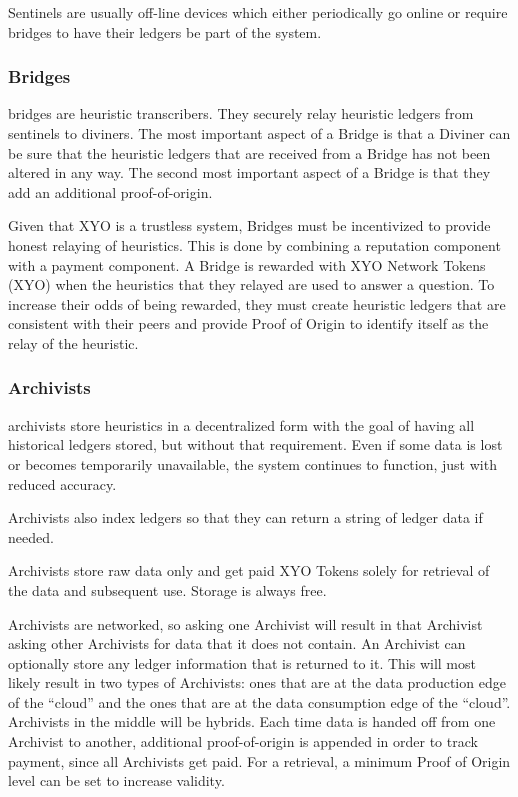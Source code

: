 \documentclass{article}
\begin{document}
Sentinels are usually off-line devices which either periodically go online or require \Glspl{bridge} to have their ledgers be part of the system.

\subsubsection {Bridges}
\Glspl{bridge} are \gls{heuristic} transcribers. They securely relay heuristic ledgers from \Glspl{sentinel} to \Glspl{diviner}. The most important aspect of a Bridge is that a Diviner can be sure that the heuristic ledgers that are received from a Bridge has not been altered in any way. The second most important aspect of a Bridge is that they add an additional \Gls{proof-of-origin}.

Given that \Gls{XYO} is a trustless system, Bridges must be incentivized to provide honest relaying of heuristics. This is done by combining a reputation component with a payment component. A Bridge is rewarded with XYO Network Tokens (XYO) when the heuristics that they relayed are used to answer a question. To increase their odds of being rewarded, they must create heuristic ledgers that are consistent with their peers and provide Proof of Origin to identify itself as the relay of the heuristic.

\subsubsection {Archivists}
\Glspl{archivist} store \glspl{heuristic} in a decentralized form with the goal of having all historical ledgers stored, but without that requirement. Even if some data is lost or becomes temporarily unavailable, the system continues to function, just with reduced \gls{accuracy}.

Archivists also index ledgers so that they can return a string of ledger data if needed.

Archivists store raw data only and get paid XYO Tokens solely for retrieval of the data and subsequent use. Storage is always free.

Archivists are networked, so asking one Archivist will result in that Archivist asking other Archivists for data that it does not contain. An Archivist can optionally store any ledger information that is returned to it. This will most likely result in two types of Archivists: ones that are at the data production edge of the ``cloud'' and the ones that are at the data consumption edge of the ``cloud''. Archivists in the middle will be hybrids. Each time data is handed off from one Archivist to another, additional \Gls{proof-of-origin} is appended in order to track payment, since all Archivists get paid. For a retrieval, a minimum Proof of Origin level can be set to increase validity.
\end{document}
